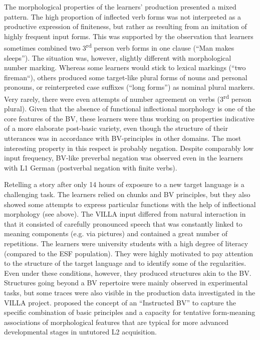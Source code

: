 \documentclass[output=paper]{langscibook}
\begin{document}
The morphological properties of the learners’ production presented a mixed pattern. The high proportion of inflected verb forms was not interpreted as a productive expression of finiteness, but rather as resulting from an imitation of highly frequent input forms. This was supported by the observation that learners sometimes combined two 3\textsuperscript{rd} person verb forms in one clause (“Man makes sleeps”). The situation was, however, slightly different with morphological number marking. Whereas some learners would stick to lexical markings (“two fireman“), others produced some target-like plural forms of nouns and personal pronouns, or reinterpreted case suffixes (“long forms”) as nominal plural markers. Very rarely, there were even attempts of number agreement on verbs (3\textsuperscript{rd} person plural). Given that the absence of functional inflectional morphology is one of the core features of the BV, these learners were thus working on properties indicative of a more elaborate post-basic variety, even though the structure of their utterances was in accordance with BV-principles in other domains. The most interesting property in this respect is probably negation. Despite comparably low input frequency, BV-like preverbal negation was observed even in the learners with L1 German (postverbal negation with finite verbs). 

Retelling a story after only 14 hours of exposure to a new target language is a challenging task. The learners relied on chunks and BV principles, but they also showed some attempts to express particular functions with the help of inflectional morphology (see above). The VILLA input differed from natural interaction in that it consisted of carefully pronounced speech that was constantly linked to meaning components (e.g. via pictures) and contained a great number of repetitions. The learners were university students with a high degree of literacy (compared to the ESF population). They were highly motivated to pay attention to the structure of the target language and to identify some of the regularities. Even under these conditions, however, they produced structures akin to the BV. Structures going beyond a BV repertoire were mainly observed in experimental tasks, but some traces were also visible in the production data investigated in the VILLA project. \citet[140]{Saturno2020} proposed the concept of an “Instructed BV” to capture the specific combination of basic principles and a capacity for tentative form-meaning associations of morphological features that are typical for more advanced developmental stages in untutored L2 acquisition.
\end{document}
